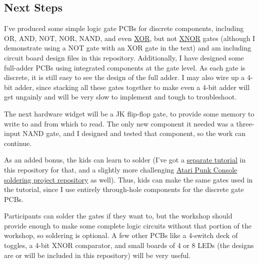 \subsection*{Next Steps}

I've produced some simple logic gate PCBs for discrete components, including OR, AND, NOT, NOR, NAND, and even {\color{webblue}\href{https://en.wikipedia.org/wiki/XOR_gate}{XOR}}, but not {\color{webblue}\href{https://en.wikipedia.org/wiki/XNOR_gate}{XNOR}} gates (although I demonstrate using a NOT gate with an XOR gate in the text) and am including circuit board design files in this repository. Additionally, I have designed some full-adder PCBs using integrated components at the gate level. As each gate is discrete, it is still easy to see the design of the full adder. I may also wire up a 4-bit adder, since stacking all these gates together to make even a 4-bit adder will get ungainly and will be very slow to implement and tough to troubleshoot. 

The next hardware widget will be a JK flip-flop gate, to provide some memory to write to and from which to read.
The only new component it needed was a three-input NAND gate, and I designed and tested that component, so the work can continue.

As an added bonus, the kids can learn to solder (I've got a {\color{webblue}\href{https://github.com/jessehamner/TechMillForKids/tree/master/soldering}{separate tutorial}} in this repository for that, and a slightly more challenging {\color{webblue}\href{https://github.com/jessehamner/AtariPunkConsole}{Atari Punk Console soldering project repository}} as well). Thus, kids can make the same gates used in the tutorial, since I use entirely through-hole components for the discrete gate PCBs. 

Participants can solder the gates if they want to, but the workshop should provide enough to make some complete logic circuits without that portion of the workshop, so soldering is optional. A few other PCBs like a 4-switch deck of toggles, a 4-bit XNOR comparator, and small boards of 4 or 8 LEDs (the designs are or will be included in this repository) will be very useful.
